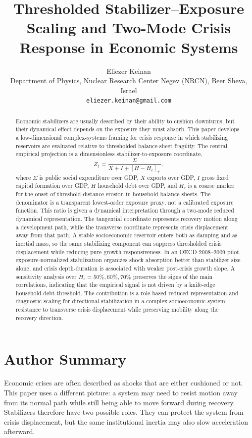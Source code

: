 \documentclass[11pt]{article}
\title{Thresholded Stabilizer--Exposure Scaling and Two-Mode Crisis Response in Economic Systems}
\author{Eliezer Keinan\\ Department of Physics, Nuclear Research Center Negev (NRCN), Beer Sheva, Israel\\ \texttt{eliezer.keinan@gmail.com}}
\date{}
\newcommand{\brpos}[1]{\left[#1\right]_+}
\begin{document}
\linenumbers
\maketitle


\begin{abstract}
Economic stabilizers are usually described by their ability to cushion downturns, but their dynamical effect depends on the exposure they must absorb. This paper develops a low-dimensional complex-systems framing for crisis response in which stabilizing reservoirs are evaluated relative to thresholded balance-sheet fragility. The central empirical projection is a dimensionless stabilizer-to-exposure coordinate,
\[
Z_1=\frac{\Sigma}{X+I+\brpos{H-H_c}},
\]
where $\Sigma$ is public social expenditure over GDP, $X$ exports over GDP, $I$ gross fixed capital formation over GDP, $H$ household debt over GDP, and $H_c$ is a coarse marker for the onset of threshold-distance erosion in household balance sheets. The denominator is a transparent lowest-order exposure proxy, not a calibrated exposure function. This ratio is given a dynamical interpretation through a two-mode reduced dynamical representation. The tangential coordinate represents recovery motion along a development path, while the transverse coordinate represents crisis displacement away from that path. A stable socioeconomic reservoir enters both as damping and as inertial mass, so the same stabilizing component can suppress thresholded crisis displacement while reducing pure growth responsiveness. In an OECD 2008--2009 pilot, exposure-normalized stabilization organizes shock absorption better than stabilizer size alone, and crisis depth-duration is associated with weaker post-crisis growth slope. A sensitivity analysis over $H_c=50\%,60\%,70\%$ preserves the signs of the main correlations, indicating that the empirical signal is not driven by a knife-edge household-debt threshold. The contribution is a role-based reduced representation and diagnostic scaling for directional stabilization in a complex socioeconomic system: resistance to transverse crisis displacement while preserving mobility along the recovery direction.
\end{abstract}

\section*{Author Summary}
Economic crises are often described as shocks that are either cushioned or not. This paper uses a different picture: a system may need to resist motion away from its normal path while still being able to move forward during recovery. Stabilizers therefore have two possible roles. They can protect the system from crisis displacement, but the same institutional inertia may also slow acceleration afterward.
\end{document}
